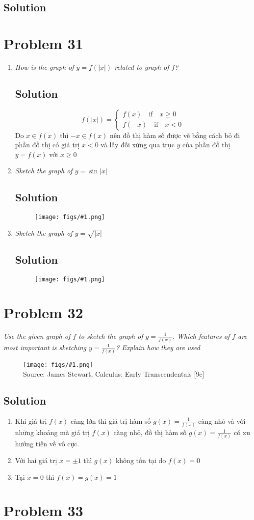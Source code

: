 \documentclass[11pt]{article}
\newcommand{\soln}{\subsection*}
\newcommand{\qn}{\textit}
\newcommand{\imagesource}[1]{{\footnotesize Source: #1}}
\newcommand{\imgqn}[1]{
	\begin{figure}[H]
		\centering
		\texttt{[image: figs/\#1.png]}\\
		\imagesource{James Stewart, Calculus: Early Transcendentals [9e]}
	\end{figure}
}
\newcommand{\imgsoln}[1]{
	\begin{figure}[H]
		\centering
		\texttt{[image: figs/\#1.png]}
	\end{figure}
}
\begin{document}
\soln{Solution}

\section*{Problem 31}

\begin{enumerate}
	\item \qn{How is the graph of $y=f(|x|)$ related to graph of $f$?}
	\soln{Solution}
	\begin{equation*}
		f(|x|)=
		\begin{cases}
			f(x) \quad \text{if} \quad x \ge 0 \\
			f(-x) \quad \text{if} \quad x < 0
		\end{cases}
	\end{equation*}
	Do $x \in f(x)$ thì $-x \in f(x)$ nên đồ thị hàm số được vẽ bằng cách bỏ đi phần đồ thị có giá trị $x < 0$ và lấy đối xứng qua trục $y$ của phần đồ thị $y=f(x)$ với $x \ge 0$
	
	\item \qn{Sketch the graph of $y=\sin|x|$}
	\soln{Solution}
	\imgsoln{1.3.31-ans.b}
	
	\item \qn{Sketch the graph of $y=\sqrt{|x|}$}
	\soln{Solution}
	\imgsoln{1.3.31-ans.c}
\end{enumerate}

\section*{Problem 32}

\qn{Use the given graph of $f$ to sketch the graph of $y=\frac{1}{f(x)}$. Which features of $f$ are most important is sketching $y=\frac{1}{f(x)}$? Explain how they are used}
\imgqn{1.3.32}

\soln{Solution}
\begin{enumerate}
	\item Khi giá trị $f(x)$ càng lớn thì giá trị hàm số $g(x)=\frac{1}{f(x)}$ càng nhỏ và với những khoảng mà giá trị $f(x)$ càng nhỏ, đồ thị hàm số $g(x)=\frac{1}{f(x)}$ có xu hướng tiến về vô cực.
	
	\item Với hai giá trị $x=\pm 1$ thì $g(x)$ không tồn tại do $f(x)=0$
	
	\item Tại $x=0$ thì $f(x)=g(x)=1$
\end{enumerate}

\section*{Problem 33}
\end{document}
